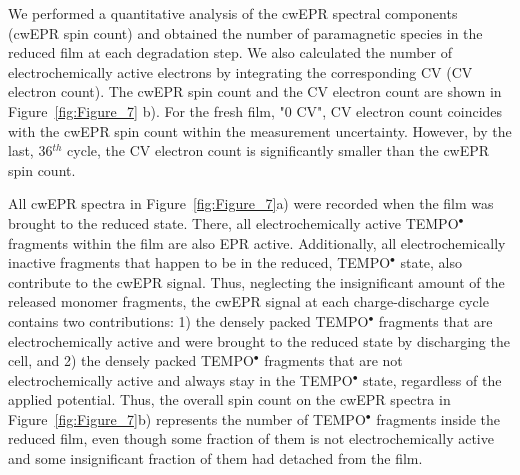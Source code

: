 \documentclass{WileyMSP-template}
\newcommand{\ik}[1]{\textcolor{RawSienna}{#1}}
\begin{document}
\bigbreak

\ik{
We performed a quantitative analysis of the cwEPR spectral components (cwEPR spin count) and obtained the number of paramagnetic species in the reduced film at each degradation step. We also calculated the number of electrochemically active electrons by integrating the corresponding CV (CV electron count). The cwEPR spin count and the CV electron count are shown in Figure~\ref{fig:Figure_7} b). 
	For the fresh film, "0 CV", CV electron count coincides with the cwEPR spin count within the measurement uncertainty. However, by the last, 36$^{th}$ cycle, the CV electron count is significantly smaller than the cwEPR spin count.
}

\bigbreak

\ik{
All cwEPR spectra in Figure~\ref{fig:Figure_7}a) were recorded when the film was brought to the reduced state. There, all electrochemically active TEMPO$^\bullet$ fragments within the film are also EPR active. Additionally, all electrochemically inactive fragments that happen to be in the reduced, TEMPO$^\bullet$ state, also contribute to the cwEPR signal. Thus, neglecting the insignificant amount of the released monomer fragments, the cwEPR signal at each charge-discharge cycle contains two contributions: 1) the densely packed TEMPO$^\bullet$ fragments that are electrochemically active and were brought to the reduced state by discharging the cell, and 2) the densely packed TEMPO$^\bullet$ fragments that are not electrochemically active and always stay in the TEMPO$^\bullet$ state, regardless of the applied potential.
Thus, the overall spin count on the cwEPR spectra in Figure~\ref{fig:Figure_7}b) represents the number of TEMPO$^\bullet$ fragments inside the reduced film, even though some fraction of them is not electrochemically active and some insignificant fraction of them had detached from the film.\\
}

\bigbreak
\end{document}
